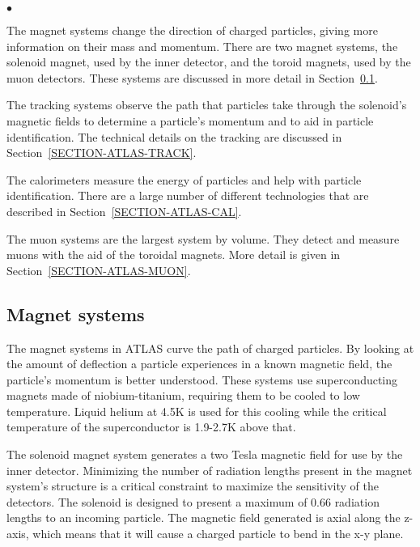 \begin{list} {$\bullet$} {}
\item The magnet systems change the direction of charged particles, giving more information on their mass and momentum. There are two magnet systems, the solenoid magnet, used by the inner detector, and the toroid magnets, used by the muon detectors. These systems are discussed in more detail in Section~\ref{SECTION-ATLAS-MAGNETS}.
\item The tracking systems observe the path that particles take through the solenoid's magnetic fields to determine a particle's momentum and to aid in particle identification. The technical details on the tracking are discussed in Section~\ref{SECTION-ATLAS-TRACK}.
\item The calorimeters measure the energy of particles and help with particle identification. There are a large number of different technologies that are described in Section~\ref{SECTION-ATLAS-CAL}.
\item The muon systems are the largest system by volume. They detect and measure muons with the aid of the toroidal magnets. More detail is given in Section~\ref{SECTION-ATLAS-MUON}.
\end{list}



\subsection{Magnet systems}
\label{SECTION-ATLAS-MAGNETS}
The magnet systems in ATLAS curve the path of charged particles. By looking at the amount of deflection a particle experiences in a known magnetic field, the particle's momentum is better understood. These systems use superconducting magnets made of niobium-titanium, requiring them to be cooled to low temperature. Liquid helium at 4.5K is used for this cooling while the critical temperature of the superconductor is 1.9-2.7K above that. 

The solenoid magnet system generates a two Tesla magnetic field for use by the inner detector. Minimizing the number of radiation lengths present in the magnet system's structure is a critical constraint to maximize the sensitivity of the detectors. The solenoid is designed to present a maximum of 0.66 radiation lengths to an incoming particle. The magnetic field generated is axial along the z-axis, which means that it will cause a charged particle to bend in the x-y plane.

